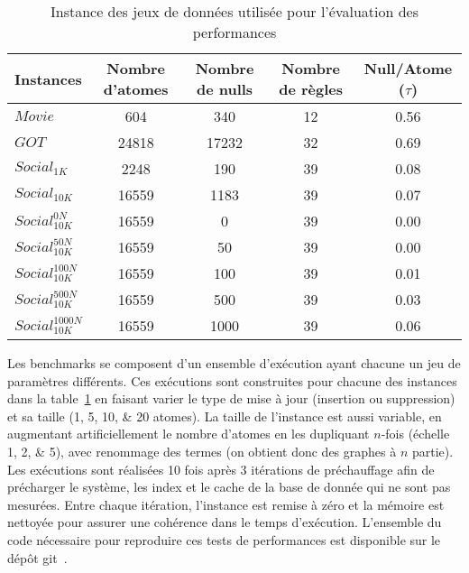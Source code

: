 \begin{table}[htb]
    \centering
    \begin{tabular}{l|c|c|c|c}
        Instances              & Nombre d'atomes & Nombre de nulls & Nombre de règles & Null/Atome ($\tau$) \\
        \hline
        \hline
        $Movie$                & \num{604}       & \num{340}       & \num{12}         & \num{0.56}          \\
        $GOT$                  & \num{24818}     & \num{17232}     & \num{32}         & \num{0.69}          \\
        \hline
        $Social_{1K}$          & \num{2248}      & \num{190}       & \num{39}         & \num{0.08}          \\
        $Social_{10K}$         & \num{16559}     & \num{1183}      & \num{39}         & \num{0.07}          \\
        \hline
        $Social_{10K}^{0N}$    & \num{16559}     & \num{0}         & \num{39}         & \num{0.00}          \\
        $Social_{10K}^{50N}$   & \num{16559}     & \num{50}        & \num{39}         & \num{0.00}          \\
        $Social_{10K}^{100N}$  & \num{16559}     & \num{100}       & \num{39}         & \num{0.01}          \\
        $Social_{10K}^{500N}$  & \num{16559}     & \num{500}       & \num{39}         & \num{0.03}          \\
        $Social_{10K}^{1000N}$ & \num{16559}     & \num{1000}      & \num{39}         & \num{0.06}          \\
    \end{tabular}
    \caption{Instance des jeux de données utilisée pour l'évaluation des performances}
    \label{table:update:xp:datasets}
\end{table}

Les benchmarks se composent d'un ensemble d'exécution ayant chacune un jeu de paramètres différents.
Ces exécutions sont construites pour chacune des instances dans la table~\ref{table:update:xp:datasets} en faisant varier le type de mise à jour (insertion ou suppression) et sa taille (\numlist{1;5;10;20} atomes).
La taille de l'instance est aussi variable, en augmentant artificiellement le nombre d'atomes en les dupliquant $n$-fois (échelle \numlist{1;2;5}), avec renommage des termes (on obtient donc des graphes à $n$ partie).
Les exécutions sont réalisées \num{10} fois après \num{3} itérations de préchauffage afin de précharger le système, les index et le cache de la base de donnée qui ne sont pas mesurées.
Entre chaque itération, l'instance est remise à zéro et la mémoire est nettoyée pour assurer une cohérence dans le temps d'exécution.
L'ensemble du code nécessaire pour reproduire ces tests de performances est disponible sur le dépôt \gls{git}~\cite{hiotUpdateChase2023}.


